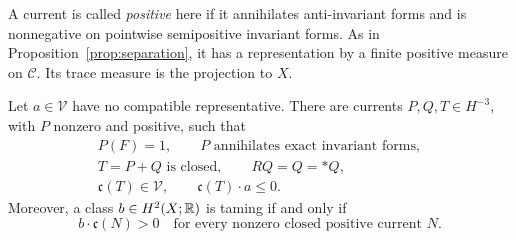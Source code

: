 A current is called \emph{positive} here if it annihilates
anti-invariant forms and is nonnegative on pointwise semipositive
invariant forms. As in Proposition~\ref{prop:separation}, it has a
representation by a finite positive measure on \(\mathscr C\).
Its trace measure is the projection to \(X\).

\begin{lemma}\label{lem:class-separation}
Let \(a\in\mathcal V\) have no compatible representative. There
are currents \(P,Q,T\in H^{-3}\), with \(P\) nonzero and positive,
such that
\begin{gather}
 P(F)=1,\qquad P\text{ annihilates exact invariant forms},
 \label{eq:class-exact-tests}\\
 T=P+Q\text{ is closed},\qquad RQ=Q=*Q,
 \label{eq:class-current}\\
 \mathfrak c(T)\in\mathcal V,\qquad
 \mathfrak c(T)\cdot a\le0.
 \label{eq:class-separator-sign}
\end{gather}
Moreover, a class \(b\in H^2(X;\mathbb R)\) is taming if and only if
\[
 b\cdot\mathfrak c(N)>0
 \quad\text{for every nonzero closed positive current }N.
\]
\end{lemma}

